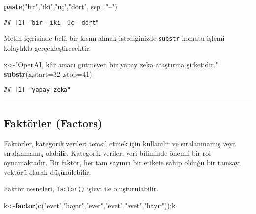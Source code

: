 \documentclass[
]{book}
\newenvironment{Shaded}{\begin{snugshade}}{\end{snugshade}}
\newcommand{\DataTypeTok}[1]{\textcolor[rgb]{0.13,0.29,0.53}{#1}}
\newcommand{\DecValTok}[1]{\textcolor[rgb]{0.00,0.00,0.81}{#1}}
\newcommand{\KeywordTok}[1]{\textcolor[rgb]{0.13,0.29,0.53}{\textbf{#1}}}
\newcommand{\NormalTok}[1]{#1}
\newcommand{\StringTok}[1]{\textcolor[rgb]{0.31,0.60,0.02}{#1}}
\begin{document}
\begin{Shaded}
\begin{Highlighting}[]
\KeywordTok{paste}\NormalTok{(}\StringTok{"bir"}\NormalTok{,}\StringTok{"iki"}\NormalTok{,}\StringTok{"üç"}\NormalTok{,}\StringTok{"dört"}\NormalTok{, }\DataTypeTok{sep=}\StringTok{"--"}\NormalTok{)}
\end{Highlighting}
\end{Shaded}

\begin{verbatim}
## [1] "bir--iki--üç--dört"
\end{verbatim}

Metin içerisinde belli bir kısmı almak istediğinizde \texttt{substr} komutu işlemi kolaylıkla gerçekleştirecektir.

\begin{Shaded}
\begin{Highlighting}[]
\NormalTok{x<-}\StringTok{"OpenAI, kâr amacı gütmeyen bir yapay zeka araştırma şirketidir."}
\KeywordTok{substr}\NormalTok{(x,}\DataTypeTok{start=}\DecValTok{32}\NormalTok{ ,}\DataTypeTok{stop=}\DecValTok{41}\NormalTok{)}
\end{Highlighting}
\end{Shaded}

\begin{verbatim}
## [1] "yapay zeka"
\end{verbatim}

\begin{center}\rule{0.5\linewidth}{0.5pt}\end{center}

\hypertarget{faktuxf6rler-factors}{%
\subsection{Faktörler (Factors)}\label{faktuxf6rler-factors}}

Faktörler, kategorik verileri temsil etmek için kullanılır ve sıralanmamış veya sıralanmamış olabilir. Kategorik veriler, veri biliminde önemli bir rol oynamaktadır. Bir faktör, her tam sayının bir etikete sahip olduğu bir tamsayı vektörü olarak düşünülebilir.

Faktör nesneleri, \texttt{factor()} işlevi ile oluşturulabilir.

\begin{Shaded}
\begin{Highlighting}[]
\NormalTok{k<-}\KeywordTok{factor}\NormalTok{(}\KeywordTok{c}\NormalTok{(}\StringTok{"evet"}\NormalTok{,}\StringTok{"hayır"}\NormalTok{,}\StringTok{"evet"}\NormalTok{,}\StringTok{"evet"}\NormalTok{,}\StringTok{"evet"}\NormalTok{,}\StringTok{"hayır"}\NormalTok{));k}
\end{Highlighting}
\end{Shaded}
\end{document}
